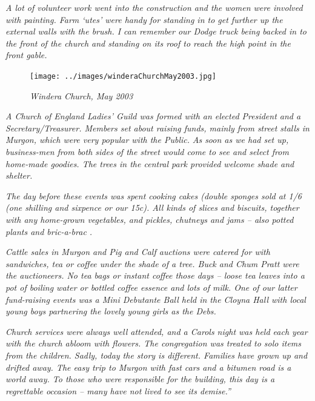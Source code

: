 \emph{A lot of volunteer work went into the construction and the women were involved with painting. Farm `utes' were handy for standing in to get further up the external walls with the brush. I can remember our Dodge truck being backed in to the front of the church and standing on its roof to reach the high point in the front gable.}









\begin{figure}[!htb]
\begin{center}
\texttt{[image: ../images/winderaChurchMay2003.jpg]}
\caption{\itshape Windera Church, May 2003}
\end{center}
\end{figure}




\emph{A Church of England Ladies' Guild was formed with an elected President and a Secretary/Treasurer. Members set about raising funds, mainly from street stalls in Murgon, which were very popular with the Public.} \emph{As soon as we had set up, business-men from both sides of the street would come to see and select from home-made goodies. The trees in the central park provided welcome shade and shelter.}



\emph{The day before these events was spent cooking cakes (double sponges sold at 1/6 (one shilling and sixpence or our 15c). All kinds of slices and biscuits, together with any home-grown vegetables, and pickles, chutneys and jams -- also potted plants and bric-a-brac .}



\emph{Cattle sales in Murgon and Pig and Calf auctions were catered for with sandwiches, tea or coffee under the shade of a tree. Buck and Chum Pratt were the auctioneers. No tea bags or instant coffee those days -- loose tea leaves into a pot of boiling water or bottled coffee essence and lots of milk. One of our latter fund-raising events was a Mini Debutante Ball held in the Cloyna Hall with local young boys partnering the lovely young girls as the Debs.}



\emph{Church services were always well attended, and a Carols night was held each year with the church abloom with flowers. The congregation was treated to solo items from the children. Sadly, today the story is different. Families have grown up and drifted away. The easy trip to Murgon with fast cars and a bitumen road is a world away. To those who were responsible for the building, this day is a regrettable occasion -- many have not lived to see its demise.''}



